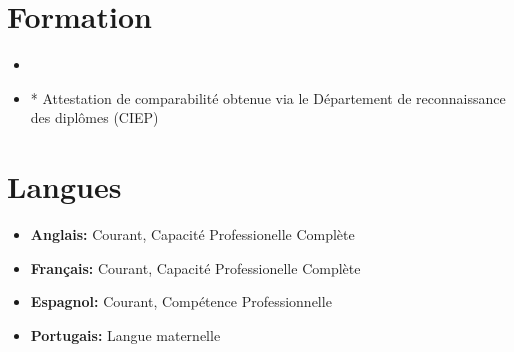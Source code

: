 \documentclass[11pt,a4paper,sans]{moderncv}        %
\begin{document}
\section{Formation}

\vspace{4pt}

\begin{itemize}

\item{}

\item{}
* Attestation de comparabilité obtenue via le Département de reconnaissance des diplômes (CIEP)
\end{itemize}

\vspace{2pt}

\section{Langues}

\vspace{1pt}

\begin{itemize}

\item \textbf{Anglais:} Courant, Capacité Professionelle Complète 

\vspace{1pt}

\item \textbf{Français:} Courant, Capacité Professionelle Complète 

\vspace{1pt}

\item \textbf{Espagnol:} Courant, Compétence Professionnelle

\vspace{1pt}

\item \textbf{Portugais:} Langue maternelle

\end{itemize}

\nocite{*}

\end{document}
